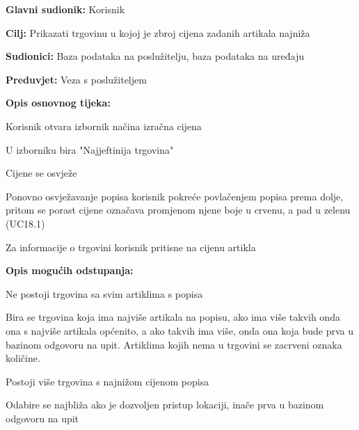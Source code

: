 				
				\noindent {}
				\begin{packed_item}
					\item \textbf{Glavni sudionik:} Korisnik
					\item  \textbf{Cilj:} Prikazati trgovinu u kojoj je zbroj cijena zadanih artikala najniža
					\item  \textbf{Sudionici:} Baza podataka na poslužitelju, baza podataka na uređaju
					\item  \textbf{Preduvjet:} Veza s poslužiteljem
					\item  \textbf{Opis osnovnog tijeka:}
					\item[] \begin{packed_enum}
						\item Korisnik otvara izbornik načina izračna cijena
						\item U izborniku bira "Najjeftinija trgovina"
						\item Cijene se osvježe
						\item Ponovno osvježavanje popisa korisnik pokreće povlačenjem popisa prema dolje, pritom se porast cijene označava promjenom njene boje u crvenu, a pad u zelenu (UC18.1)
						\item Za informacije o trgovini korisnik pritisne na cijenu artikla
					\end{packed_enum}
					\item  \textbf{Opis mogućih odstupanja:}
					\item[] \begin{packed_item}
						\item[3.a] Ne postoji trgovina sa svim artiklima s popisa
						\item[] \begin{packed_enum}
							\item Bira se trgovina koja ima najviše artikala na popisu, ako ima više takvih onda ona s najviše artikala općenito, a ako takvih ima više, onda ona koja bude prva u bazinom odgovoru na upit. Artiklima kojih nema u trgovini se zacrveni oznaka količine.
						\end{packed_enum}
						\item[3.b] Postoji više trgovina s najnižom cijenom popisa
						\item[] \begin{packed_enum}
							\item Odabire se najbliža ako je dozvoljen pristup lokaciji, inače prva u bazinom odgovoru na upit
						\end{packed_enum}

\end{packed_item}
\end{packed_item}
